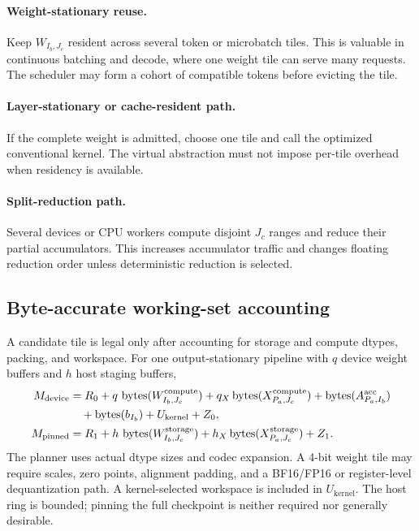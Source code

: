 \paragraph{Weight-stationary reuse.}
Keep $W_{I_b,J_c}$ resident across several token or microbatch tiles. This is valuable in continuous batching and decode, where one weight tile can serve many requests. The scheduler may form a cohort of compatible tokens before evicting the tile.

\paragraph{Layer-stationary or cache-resident path.}
If the complete weight is admitted, choose one tile and call the optimized conventional kernel. The virtual abstraction must not impose per-tile overhead when residency is available.

\paragraph{Split-reduction path.}
Several devices or CPU workers compute disjoint $J_c$ ranges and reduce their partial accumulators. This increases accumulator traffic and changes floating reduction order unless deterministic reduction is selected.

\subsection{Byte-accurate working-set accounting}

A candidate tile is legal only after accounting for storage and compute dtypes, packing, and workspace. For one output-stationary pipeline with $q$ device weight buffers and $h$ host staging buffers,
\begin{align}
M_{\mathrm{device}}
&=R_0+q\,\operatorname{bytes}(W_{I_b,J_c}^{\mathrm{compute}})
 +q_X\operatorname{bytes}(X_{P_a,J_c}^{\mathrm{compute}})
 +\operatorname{bytes}(A_{P_a,I_b}^{\mathrm{acc}}) \notag\\
&\quad +\operatorname{bytes}(b_{I_b})+U_{\mathrm{kernel}}+Z_0,\label{eq:linear-device}\\
M_{\mathrm{pinned}}
&=R_1+h\,\operatorname{bytes}(W_{I_b,J_c}^{\mathrm{storage}})
 +h_X\operatorname{bytes}(X_{P_a,J_c}^{\mathrm{storage}})+Z_1.\label{eq:linear-host}
\end{align}
The planner uses actual dtype sizes and codec expansion. A 4-bit weight tile may require scales, zero points, alignment padding, and a BF16/FP16 or register-level dequantization path. A kernel-selected workspace is included in $U_{\mathrm{kernel}}$. The host ring is bounded; pinning the full checkpoint is neither required nor generally desirable.

